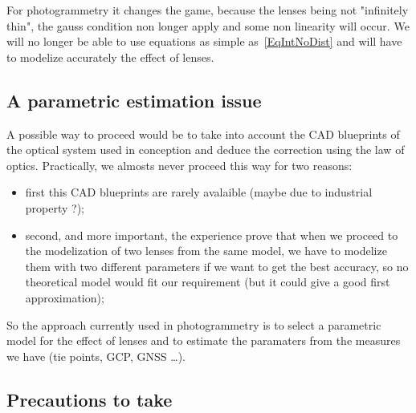 For photogrammetry it changes the game, because the lenses being not "infinitely thin", the gauss
condition non longer apply and some non linearity will occur. We will no longer be able to use
equations as simple as~\ref{EqIntNoDist} and will have to modelize accurately the effect of
lenses. 


\subsection{A parametric estimation issue}

A possible way to proceed would be to take into account the CAD blueprints of the optical
system used in conception and deduce the correction using the law of optics.  
Practically, we almosts never proceed this way for two reasons:

\begin{itemize}
   \item first this CAD blueprints are rarely avalaible (maybe due to industrial property ?);
   \item second, and more important, the experience prove that when we proceed to the
         modelization of two lenses from the same model, we have to modelize them with two
         different parameters if we want to get the best accuracy, so no theoretical model 
         would fit our requirement (but it could give a good first approximation);
\end{itemize}

So the approach currently used in photogrammetry is to select a parametric model
for the effect of lenses and to estimate the paramaters from the measures we have  (tie points,
GCP, GNSS  \dots).


\subsection{Precautions to take}
\label{ParamFit}

